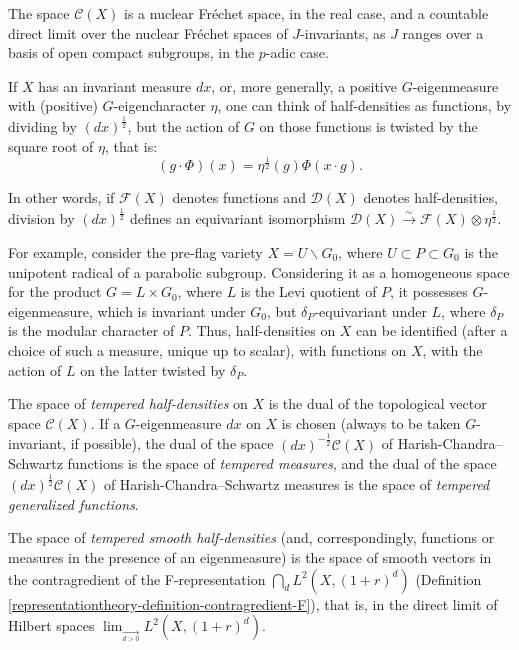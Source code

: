 \begin{remark}
 \label{remark-HCS-nuclear}
The space $\mathcal C(X)$ is a nuclear Fr\'echet space, in the real case, and a countable direct limit over the nuclear Fr\'echet spaces of $J$-invariants, as $J$ ranges over a basis of open compact subgroups, in the $p$-adic case.
\end{remark}



\begin{remark}
 \label{remark-half-densities}
If $X$ has an invariant measure $dx$, or, more generally, a positive $G$-eigenmeasure with (positive) $G$-eigencharacter $\eta$, one can think of half-densities as functions, by dividing by $(dx)^\frac{1}{2}$, but the action of $G$ on those functions is twisted by the square root of $\eta$, that is: 
\begin{equation}
 \label{equation-twisted-action}
 (g\cdot \Phi)(x) = \eta^\frac{1}{2}(g) \Phi(x\cdot g).
\end{equation}

In other words, if $\mathcal F(X)$ denotes functions and $\mathcal D(X)$ denotes half-densities, division by $(dx)^\frac{1}{2}$ defines an equivariant isomorphism $\mathcal D(X) \xrightarrow\sim \mathcal F(X) \otimes \eta^\frac{1}{2}$. 

For example, consider the pre-flag variety $X=U\backslash G_0$, where $U\subset P\subset G_0$ is the unipotent radical of a parabolic subgroup. Considering it as a homogeneous space for the product $G=L\times G_0$, where $L$ is the Levi quotient of $P$, it possesses $G$-eigenmeasure, which is invariant under $G_0$, but $\delta_P$-equivariant under $L$, where $\delta_P$ is the modular character of $P$. Thus, half-densities on $X$ can be identified (after a choice of such a measure, unique up to scalar), with functions on $X$, with the action of $L$ on the latter twisted by $\delta_P$.
\end{remark}


\begin{definition}
 \label{definition-tempered}
The space of {\it tempered half-densities} on $X$ is the dual of the topological vector space $\mathcal C(X)$. If a $G$-eigenmeasure $dx$ on $X$ is chosen (always to be taken $G$-invariant, if possible), the dual of the space $(dx)^{-\frac{1}{2}} \mathcal C(X)$ of Harish-Chandra--Schwartz functions is the space of {\it tempered measures}, and the dual of the space $(dx)^{\frac{1}{2}} \mathcal C(X)$ of Harish-Chandra--Schwartz measures is the space of {\it tempered generalized functions}. 

The space of {\it tempered smooth half-densities} (and, correspondingly, functions or measures in the presence of an eigenmeasure) is the space of smooth vectors in the contragredient of the F-representation $\bigcap_d L^2(X, (1+r)^d)$ (Definition \ref{representationtheory-definition-contragredient-F}), that is, in the direct limit of Hilbert spaces $\lim_{\underset{d >0}{\to}} L^2(X, (1+r)^d)$.
\end{definition}

